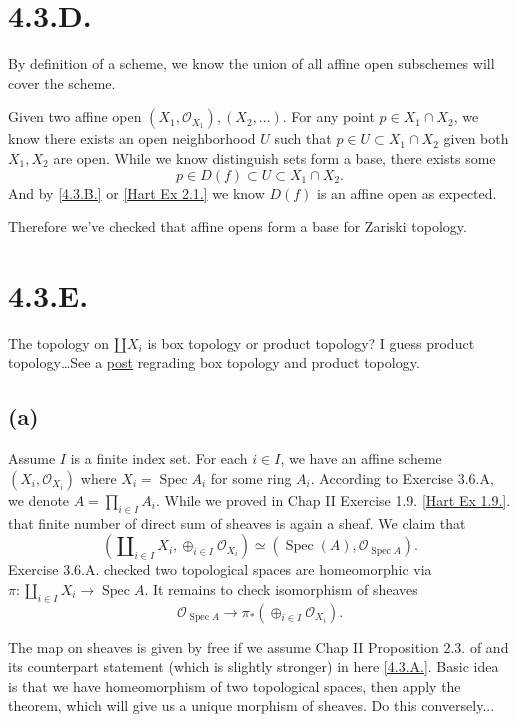 \section{4.3.D.}

By definition of a scheme, we know the union of all affine open subschemes will cover the scheme. 

Given two affine open $(X_1,\mathcal O_{X_1}), (X_2,...)$. For any point $p\in X_1\cap X_2$, we know there exists an open neighborhood $U$ such that $p\in U\subset X_1\cap X_2$ given both $X_1,X_2$ are open. While we know distinguish sets form a base, there exists some \[p\in D(f)\subset U\subset X_1\cap X_2.\] And by \ref{4.3.B.} or \ref{Hart Ex 2.1.} we know $D(f)$ is an affine open as expected. 

Therefore we've checked that affine opens form a base for Zariski topology.

\section{4.3.E.}\label{4.3.E.}

The topology on $\amalg X_i$ is box topology or product topology? I guess product topology\dots See a \href{https://math.stackexchange.com/questions/871610/why-are-box-topology-and-product-topology-different-on-infinite-products-of-topo}{post} regrading box topology and product topology.

\subsection{(a)}

Assume $I$ is a finite index set. For each $i\in I$, we have an affine scheme $(X_i,\mathcal O_{X_i})$ where $X_i=\operatorname{Spec}A_i$ for some ring $A_i$. According to Exercise 3.6.A, we denote $A=\prod_{i\in I}A_i$. While we proved in \cite{hartshorne2013algebraic} Chap II Exercise 1.9. \ref{Hart Ex 1.9.}. that finite number of direct sum of sheaves is again a sheaf. We claim that
\[(\amalg_{i\in I} X_i,\oplus_{i\in I}\mathcal O_{X_i})\simeq (\operatorname{Spec}(A),\mathcal O_{\operatorname{Spec}A}).\]
Exercise 3.6.A. checked two topological spaces are homeomorphic via $\pi:\amalg_{i\in I} X_i\to \operatorname{Spec}A$. It remains to check isomorphism of sheaves 
\[\mathcal O_{\operatorname{Spec}A}\to\pi_{\ast}(\oplus_{i\in I}\mathcal O_{X_i}).\]

The map on sheaves is given by free if we assume Chap II Proposition 2.3. of \cite{hartshorne2013algebraic} and its counterpart statement (which is slightly stronger) in here \ref{4.3.A.}. Basic idea is that we have homeomorphism of two topological spaces, then apply the theorem, which will give us a unique morphism of sheaves. Do this conversely...

